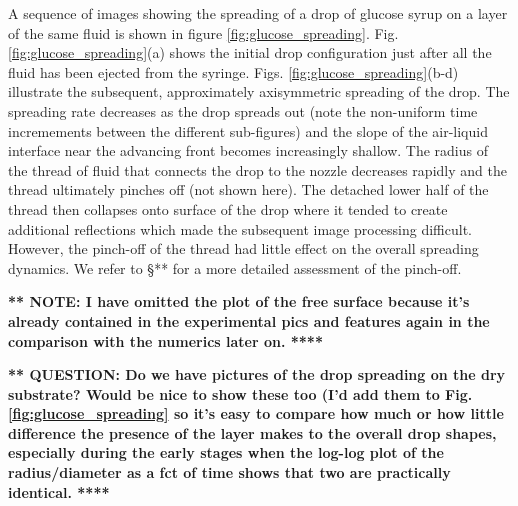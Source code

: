\documentclass[aip,graphicx]{revtex4-1}
\begin{document}
A sequence of images showing the spreading of a drop
of glucose syrup on a layer of the same fluid is shown in figure
\ref{fig:glucose_spreading}. Fig. \ref{fig:glucose_spreading}(a)
shows the initial drop configuration just after all the fluid 
has been ejected from the syringe. Figs. 
\ref{fig:glucose_spreading}(b-d) illustrate the subsequent,
approximately axisymmetric spreading of the drop. The spreading
rate decreases as the drop spreads out (note the non-uniform time
incremements between the different sub-figures) and
the slope of the  air-liquid interface near the advancing front 
becomes increasingly shallow. The radius of the thread of fluid that connects
the drop to the nozzle decreases rapidly and the thread ultimately 
pinches off (not shown here). The detached lower half of the thread 
then collapses onto surface of the drop where it tended to create 
additional reflections which made the subsequent image processing 
difficult. However, the pinch-off of the thread had little effect on the 
overall spreading dynamics. We refer to \S *** for a more detailed
assessment of the pinch-off.



{\bf *** NOTE: I have omitted the plot of the free surface because
it's already contained in the experimental pics and features again
in the comparison with the numerics later on. ****}


{\bf *** QUESTION: Do we have pictures of the drop spreading on the
dry substrate? Would be nice to show these too (I'd add them to Fig.
\ref{fig:glucose_spreading} so it's easy to compare how much
or how little difference the presence of the layer makes to the
overall drop shapes, especially during the early stages when
the log-log plot of the radius/diameter as a fct of time
shows that two are practically identical. ****}
\end{document}
